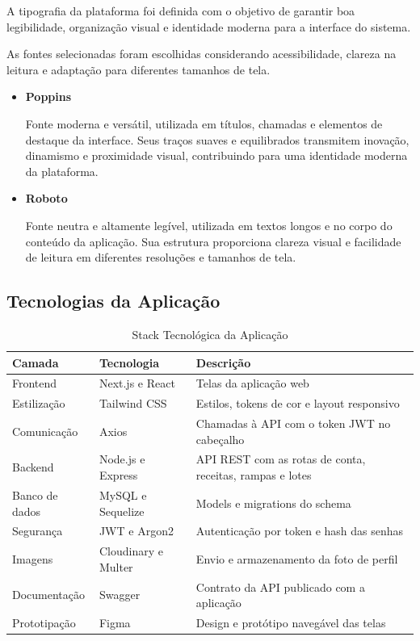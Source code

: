 A tipografia da plataforma foi definida com o objetivo de garantir boa legibilidade, organização visual e identidade moderna para a interface do sistema.

As fontes selecionadas foram escolhidas considerando acessibilidade, clareza na leitura e adaptação para diferentes tamanhos de tela.

\begin{itemize}

\item \textbf{Poppins}

Fonte moderna e versátil, utilizada em títulos, chamadas e elementos de destaque da interface. Seus traços suaves e equilibrados transmitem inovação, dinamismo e proximidade visual, contribuindo para uma identidade moderna da plataforma.

\item \textbf{Roboto}

Fonte neutra e altamente legível, utilizada em textos longos e no corpo do conteúdo da aplicação. Sua estrutura proporciona clareza visual e facilidade de leitura em diferentes resoluções e tamanhos de tela.

\end{itemize}

\subsection{Tecnologias da Aplicação}

\begin{table}[H]
\centering
\caption{Stack Tecnológica da Aplicação}
\label{tab:stack-app}
\begin{tabular}{|l|l|p{7cm}|}
\hline
\textbf{Camada} & \textbf{Tecnologia} & \textbf{Descrição} \\
\hline
Frontend & Next.js e React & Telas da aplicação web~\cite{nextjsdocs} \\
\hline
Estilização & Tailwind CSS & Estilos, tokens de cor e layout responsivo~\cite{tailwinddocs} \\
\hline
Comunicação & Axios & Chamadas à API com o token JWT no cabeçalho \\
\hline
Backend & Node.js e Express & API REST com as rotas de conta, receitas, rampas e lotes~\cite{expressdocs} \\
\hline
Banco de dados & MySQL e Sequelize & Models e migrations do schema~\cite{sequelizedocs} \\
\hline
Segurança & JWT e Argon2 & Autenticação por token e hash das senhas \\
\hline
Imagens & Cloudinary e Multer & Envio e armazenamento da foto de perfil \\
\hline
Documentação & Swagger & Contrato da API publicado com a aplicação \\
\hline
Prototipação & Figma & Design e protótipo navegável das telas \\
\hline
\end{tabular}
\end{table}

